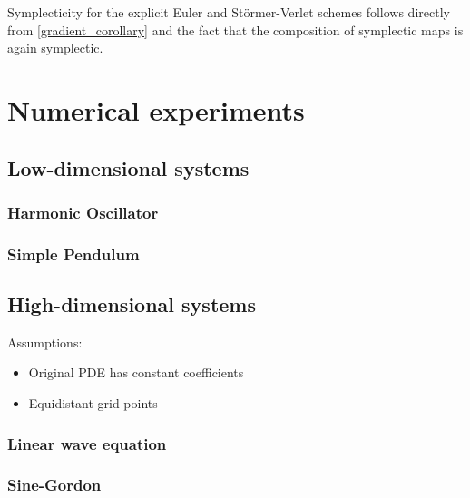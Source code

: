 \documentclass[twoside,a4paper]{article}
\begin{document}
Symplecticity for the explicit Euler and Störmer-Verlet schemes follows directly 
from \cref{gradient_corollary} and the fact that the composition of symplectic maps is again symplectic.


\section{Numerical experiments}

\subsection{Low-dimensional systems}

\subsubsection{Harmonic Oscillator}

\subsubsection{Simple Pendulum}

\subsection{High-dimensional systems}


Assumptions:
\begin{itemize}
	\item Original PDE has constant coefficients 
	\item Equidistant grid points
\end{itemize}


\subsubsection{Linear wave equation}


\subsubsection{Sine-Gordon}
\end{document}

